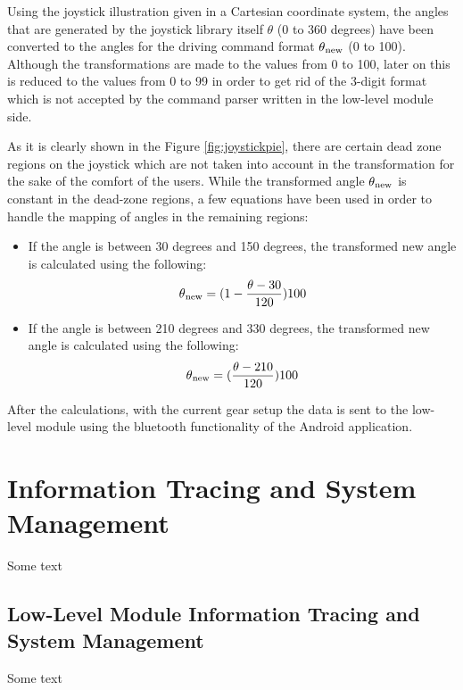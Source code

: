 Using the joystick illustration given in a Cartesian coordinate system, the angles that are generated by the joystick library itself $\theta$ (0 to 360 degrees) have been converted to the angles for the driving command format $\theta\textsubscript{new}$ (0 to 100). Although the transformations are made to the values from 0 to 100, later on this is reduced to the values from 0 to 99 in order to get rid of the 3-digit format which is not accepted by the command parser written in the low-level module side.

As it is clearly shown in the Figure \ref{fig:joystickpie}, there are certain dead zone regions on the joystick which are not taken into account in the transformation for the sake of the comfort of the users. While the transformed angle $\theta\textsubscript{new}$ is  constant in the dead-zone regions, a few equations have been used in order to handle the mapping of angles in the remaining regions:
\begin{itemize}
	\item If the angle is between 30 degrees and 150 degrees, the transformed new angle is calculated using the following:
	\begin{equation}
	\theta\textsubscript{new}=(1 - \frac{\theta - 30}{120}) 100
	\end{equation}
	\item If the angle is between 210 degrees and 330 degrees, the transformed new angle is calculated using the following:
	\begin{equation}
	\theta\textsubscript{new}=(\frac{\theta - 210}{120}) 100
	\end{equation} 
\end{itemize}
After the calculations, with the current gear setup the data is sent to the low-level module using the bluetooth functionality of the Android application.



\chapter{Information Tracing and System Management}
Some text \\
\section{Low-Level Module Information Tracing and System Management}
Some text \\
